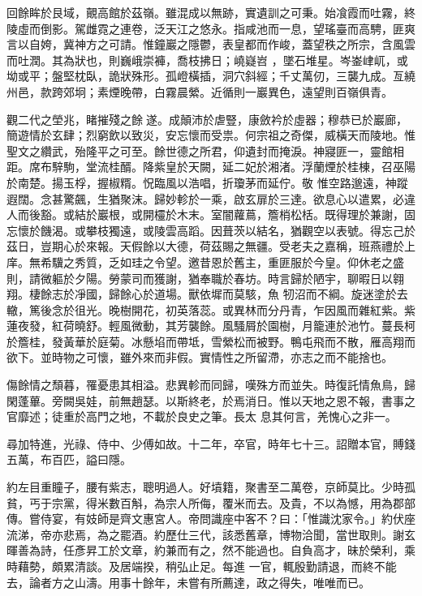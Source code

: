 \begin{pinyinscope}
回餘眸於艮域，覿高館於茲嶺。雖混成以無跡，實遺訓之可秉。始飡霞而吐霧，終陵虛而倒影。駕雌霓之連卷，泛天江之悠永。指咸池而一息，望瑤臺而高騁，匪爽言以自姱，冀神方之可請。惟鐘巖之隱鬱，表皇都而作峻，蓋望秩之所宗，含風雲而吐潤。其為狀也，則巍峨崇褲，喬枝拂日；嶢嶷岧
 ，墜石堆星。岑崟峍屼，或坳或平；盤堅枕臥，詭狀殊形。孤嶝橫插，洞穴斜經；千丈萬仞，三襲九成。亙繞州邑，款跨郊坰；素煙晚帶，白霧晨縈。近循則一巖異色，遠望則百嶺俱青。



 觀二代之塋兆，睹摧殘之餘遂。成顛沛於虐豎，康斂衿於虛器；穆恭已於巖廊，簡遊情於玄肆；烈窮飲以致災，安忘懷而受祟。何宗祖之奇傑，威橫天而陵地。惟聖文之纘武，殆隆平之可至。餘世德之所君，仰遺封而掩淚。神寢匪一，靈館相距。席布騂駒，堂流桂醑。降紫皇於天闕，延二妃於湘渚。浮蘭煙於桂棟，召巫陽於南楚。揚玉桴，握椒糈。怳臨風以浩唱，折瓊茅而延佇。敬
 惟空路邈遠，神蹤遐闊。念甚驚飆，生猶聚沫。歸妙軫於一乘，啟玄扉於三達。欲息心以遣累，必違人而後豁。或結於巖根，或開欞於木末。室闇蘿蔦，簷梢松栝。既得理於兼謝，固忘懷於饑渴。或攀枝獨遠，或陵雲高蹈。因葺茨以結名，猶觀空以表號。得忘己於茲日，豈期心於來報。天假餘以大德，荷茲賜之無疆。受老夫之嘉稱，班燕禮於上庠。無希驥之秀質，乏如珪之令望。邀昔恩於舊主，重匪服於今皇。仰休老之盛則，請微軀於夕陽。勞蒙司而獲謝，猶奉職於春坊。時言歸於陋宇，聊暇日以翱翔。棲餘志於凈國，歸餘心於道場。獸依墀而莫駭，魚
 牣沼而不綱。旋迷塗於去轍，篤後念於徂光。晚樹開花，初英落蕊。或異林而分丹青，乍因風而雜紅紫。紫蓮夜發，紅荷曉舒。輕風微動，其芳襲餘。風騷屑於園樹，月籠連於池竹。蔓長柯於簷桂，發黃華於庭菊。冰懸埳而帶坻，雪縈松而被野。鴨屯飛而不散，雁高翔而欲下。並時物之可懷，雖外來而非假。實情性之所留滯，亦志之而不能捨也。



 傷餘情之頹暮，罹憂患其相溢。悲異軫而同歸，嘆殊方而並失。時復託情魚鳥，歸閑蓬蓽。旁闕吳娃，前無趙瑟。以斯終老，於焉消日。惟以天地之恩不報，書事之官靡述；徒重於高門之地，不載於良史之筆。長太
 息其何言，羌愧心之非一。



 尋加特進，光祿、侍中、少傅如故。十二年，卒官，時年七十三。詔贈本官，賻錢五萬，布百匹，謚曰隱。



 約左目重瞳子，腰有紫志，聰明過人。好墳籍，聚書至二萬卷，京師莫比。少時孤貧，丐于宗黨，得米數百斛，為宗人所侮，覆米而去。及貴，不以為憾，用為郡部傳。嘗侍宴，有妓師是齊文惠宮人。帝問識座中客不？曰：「惟識沈家令。」約伏座流涕，帝亦悲焉，為之罷酒。約歷仕三代，該悉舊章，博物洽聞，當世取則。謝玄暉善為詩，任彥昇工於文章，約兼而有之，然不能過也。自負高才，昧於榮利，乘時藉勢，頗累清談。及居端揆，稍弘止足。每進
 一官，輒殷勤請退，而終不能去，論者方之山濤。用事十餘年，未嘗有所薦達，政之得失，唯唯而已。




\end{pinyinscope}
